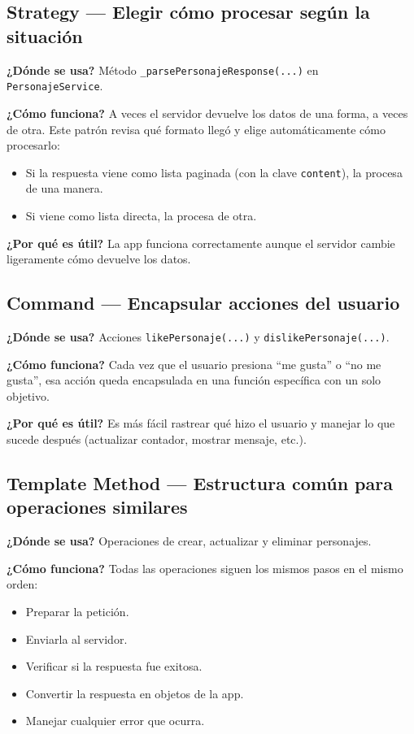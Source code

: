 \documentclass[12pt,a4paper]{article}
\begin{document}
\subsection{Strategy — Elegir cómo procesar según la situación}
\textbf{¿Dónde se usa?} Método \texttt{\_parsePersonajeResponse(...)} en \texttt{PersonajeService}.

\textbf{¿Cómo funciona?} A veces el servidor devuelve los datos de una forma, a veces de otra. Este patrón revisa qué formato llegó y elige automáticamente cómo procesarlo:
\begin{itemize}[leftmargin=1.2cm]
  \item Si la respuesta viene como lista paginada (con la clave \texttt{content}), la procesa de una manera.
  \item Si viene como lista directa, la procesa de otra.
\end{itemize}

\textbf{¿Por qué es útil?} La app funciona correctamente aunque el servidor cambie ligeramente cómo devuelve los datos.

\subsection{Command — Encapsular acciones del usuario}
\textbf{¿Dónde se usa?} Acciones \texttt{likePersonaje(...)} y \texttt{dislikePersonaje(...)}.

\textbf{¿Cómo funciona?} Cada vez que el usuario presiona ``me gusta'' o ``no me gusta'', esa acción queda encapsulada en una función específica con un solo objetivo.

\textbf{¿Por qué es útil?} Es más fácil rastrear qué hizo el usuario y manejar lo que sucede después (actualizar contador, mostrar mensaje, etc.).

\subsection{Template Method — Estructura común para operaciones similares}
\textbf{¿Dónde se usa?} Operaciones de crear, actualizar y eliminar personajes.

\textbf{¿Cómo funciona?} Todas las operaciones siguen los mismos pasos en el mismo orden:
\begin{itemize}[leftmargin=1.2cm]
  \item Preparar la petición.
  \item Enviarla al servidor.
  \item Verificar si la respuesta fue exitosa.
  \item Convertir la respuesta en objetos de la app.
  \item Manejar cualquier error que ocurra.
\end{itemize}
\end{document}
